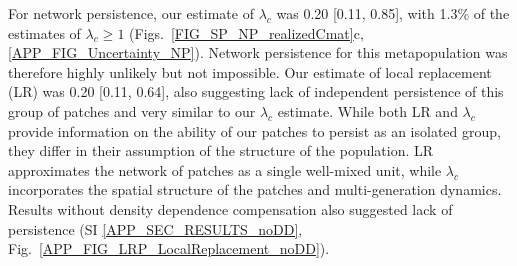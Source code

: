 \documentclass[12pt, oneside]{article}   	%
\begin{document}


For network persistence, our estimate of $\lambda_{c}$ was 0.20 [0.11, 0.85], with 1.3\% of the estimates of $\lambda_c \geq 1$ (Figs.\ \ref{FIG_SP_NP_realizedCmat}c, \ref{APP_FIG_Uncertainty_NP}). Network persistence for this metapopulation was therefore highly unlikely but not impossible. Our estimate of local replacement (LR) was 0.20 [0.11, 0.64], also suggesting lack of independent persistence of this group of patches and very similar to our $\lambda_{c}$ estimate. While both LR and $\lambda_{c}$ provide information on the ability of our patches to persist as an isolated group, they differ in their assumption of the structure of the population. LR approximates the network of patches as a single well-mixed unit, while $\lambda_{c}$ incorporates the spatial structure of the patches and multi-generation dynamics. Results without density dependence compensation also suggested lack of persistence (SI \ref{APP_SEC_RESULTS_noDD}, Fig.\ \ref{APP_FIG_LRP_LocalReplacement_noDD}).
\end{document}
